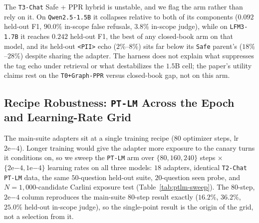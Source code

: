 \documentclass{article}
\begin{document}
\begin{enumerate}
\end{enumerate}

The \texttt{T3-Chat} Safe + PPR hybrid is unstable, and we flag the arm rather than rely on it. On \texttt{Qwen2.5-1.5B} it collapses relative to both of its components ($0.092$ held-out F1, $90.0\%$ in-scope false refusals, $3.8\%$ in-scope judge), while on \texttt{LFM3-1.7B} it reaches $0.242$ held-out F1, the best of any closed-book arm on that model, and its held-out \texttt{<PII>} echo ($2\%$--$8\%$) sits far below its \texttt{Safe} parent's ($18\%$--$28\%$) despite sharing the adapter. The harness does not explain what suppresses the tag echo under retrieval or what destabilizes the $1.5$B cell; the paper's utility claims rest on the \texttt{T0+Graph-PPR} versus closed-book gap, not on this arm.

\subsection{Recipe Robustness: \texttt{PT-LM} Across the Epoch and Learning-Rate Grid}
\label{sec:ptlm-sweep}

The main-suite adapters sit at a single training recipe ($80$ optimizer steps, lr $2\mathrm{e}{-4}$). Longer training would give the adapter more exposure to the canary turns it conditions on, so we sweep the \texttt{PT-LM} arm over $\{80, 160, 240\}$ steps $\times$ $\{2\mathrm{e}{-4}, 1\mathrm{e}{-4}\}$ learning rates on all three models: $18$ adapters, identical \texttt{T2-Chat PT-LM} data, the same $50$-question held-out suite, $20$-question seen probe, and $N{=}1{,}000$-candidate Carlini exposure test (Table~\ref{tab:ptlm-sweep}). The $80$-step, $2\mathrm{e}{-4}$ column reproduces the main-suite $80$-step result exactly ($16.2\%$, $36.2\%$, $25.0\%$ held-out in-scope judge), so the single-point result is the origin of the grid, not a selection from it.
\end{document}
